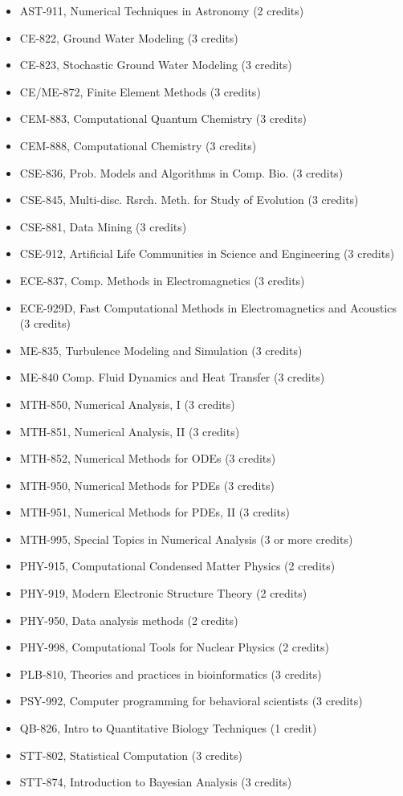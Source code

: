 \begin{itemize}
\item AST-911, Numerical Techniques in Astronomy (2 credits)  
\item CE-822, Ground Water Modeling (3 credits)  
\item CE-823, Stochastic Ground Water Modeling (3 credits)  
\item CE/ME-872, Finite Element Methods (3 credits)  
\item CEM-883, Computational Quantum Chemistry (3 credits)  
\item CEM-888, Computational Chemistry (3 credits)  
\item CSE-836, Prob. Models and Algorithms in Comp. Bio. (3 credits)  
\item CSE-845, Multi-disc. Rsrch. Meth. for Study of Evolution (3 credits)  
\item CSE-881, Data Mining (3 credits)  
\item CSE-912, Artificial Life Communities in Science and Engineering (3 credits)  
\item ECE-837, Comp. Methods in Electromagnetics (3 credits)  
\item ECE-929D, Fast Computational Methods in Electromagnetics and
  Acoustics (3 credits)
\item ME-835, Turbulence Modeling and Simulation (3 credits)  
\item ME-840	Comp. Fluid Dynamics and Heat Transfer (3 credits)  
\item MTH-850, Numerical Analysis, I (3 credits)  
\item MTH-851, Numerical Analysis, II (3 credits)  
\item MTH-852, Numerical Methods for ODEs (3 credits)  
\item MTH-950, Numerical Methods for PDEs (3 credits)  
\item MTH-951, Numerical Methods for PDEs, II (3 credits)  
\item MTH-995, Special Topics in Numerical Analysis (3 or more credits)  
\item PHY-915, Computational Condensed Matter Physics (2 credits)  
\item PHY-919, Modern Electronic Structure Theory (2 credits)  
\item PHY-950, Data analysis methods (2 credits)  
\item PHY-998, Computational Tools for Nuclear Physics (2 credits)  
\item PLB-810, Theories and practices in bioinformatics (3 credits)  
\item PSY-992, Computer programming for behavioral scientists (3 credits)    
\item QB-826, Intro to Quantitative Biology Techniques (1 credit)  
\item STT-802, Statistical Computation (3 credits)  
\item STT-874, Introduction to Bayesian Analysis (3 credits) 
\end{itemize}